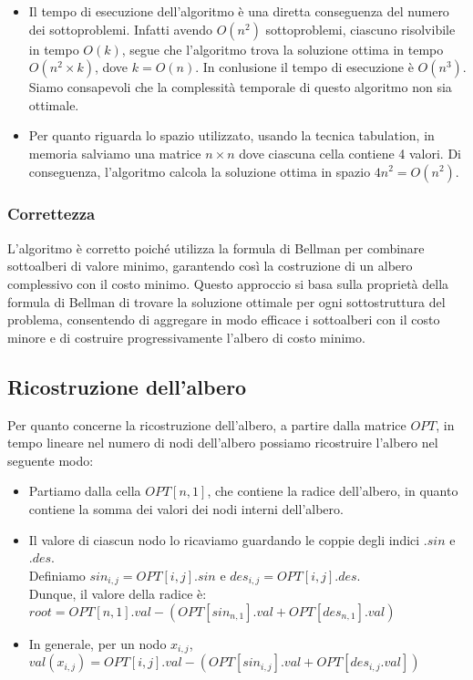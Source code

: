 \begin{itemize}
	\item{
		Il tempo di esecuzione dell'algoritmo è una diretta conseguenza del numero dei sottoproblemi. Infatti avendo $O(n^2)$ sottoproblemi,
		ciascuno risolvibile in tempo $O(k)$, segue che l'algoritmo trova la soluzione ottima in tempo $O(n^2 \times k)$, dove $k = O(n)$. 
		In conlusione il tempo di esecuzione è $O(n^3)$.\\
		Siamo consapevoli che la complessità temporale di questo algoritmo non sia ottimale.
	}
	\item{
		Per quanto riguarda lo spazio utilizzato, usando la tecnica tabulation, in memoria salviamo una matrice $n \times n$ dove ciascuna cella contiene 4 valori.
		Di conseguenza, l'algoritmo calcola la soluzione ottima in spazio $4n^2 = O(n^2)$.
	}
\end{itemize}

\subsubsection*{Correttezza}

L'algoritmo è corretto poiché utilizza la formula di Bellman per combinare sottoalberi di valore minimo, 
garantendo così la costruzione di un albero complessivo con il costo minimo. Questo approccio si basa sulla proprietà 
della formula di Bellman di trovare la soluzione ottimale per ogni sottostruttura del problema, consentendo di aggregare 
in modo efficace i sottoalberi con il costo minore e di costruire progressivamente l'albero di costo minimo.

\subsection{Ricostruzione dell'albero}

Per quanto concerne la ricostruzione dell'albero, a partire dalla matrice $OPT$, in tempo lineare nel numero di nodi dell'albero possiamo ricostruire l'albero nel seguente modo:

\begin{itemize}
	\item Partiamo dalla cella $OPT[n, 1]$, che contiene la radice dell'albero, in quanto contiene la somma dei valori dei nodi interni dell'albero.
	\item {
		Il valore di ciascun nodo lo ricaviamo guardando le coppie degli indici $.sin$ e $.des$.\\
		Definiamo $sin_{i,j} = OPT[i, j].sin$ e $des_{i,j} = OPT[i, j].des$.\\
		Dunque, il valore della radice è:\\
		$root = OPT[n, 1].val - (OPT[sin_{n,1}].val + OPT[des_{n, 1}].val)$
		}
	\item {
		In generale, per un nodo $x_{i,j}$, $val(x_{i,j}) = OPT[i, j].val - (OPT[sin_{i,j}].val + OPT[des_{i,j}.val])$
	}
\end{itemize}

